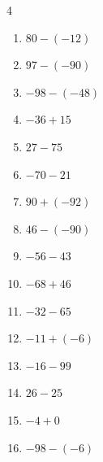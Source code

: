 \begin{multicols}{4}
\begin{enumerate}
        \phantom{$=-149$}

  \item $80-(-12)$

        \phantom{$=92$}

  \item $97-(-90)$

        \phantom{$=187$}

  \item $-98-(-48)$

        \phantom{$=-50$}

  \item $-36+15$

        \phantom{$=-21$}

  \item $27-75$

        \phantom{$=-48$}

  \item $-70-21$

        \phantom{$=-91$}

  \item $90+(-92)$

        \phantom{$=-2$}

  \item $46-(-90)$

        \phantom{$=136$}

  \item $-56-43$

        \phantom{$=-99$}

\columnbreak %

  \item $-68+46$

        \phantom{$=-22$}

  \item $-32-65$

        \phantom{$=-97$}

  \item $-11+(-6)$

        \phantom{$=-17$}

  \item $-16-99$

        \phantom{$=-115$}

  \item $26-25$

        \phantom{$=1$}

  \item $-4+0$

        \phantom{$=-4$}

  \item $-98-(-6)$


\end{enumerate}
\end{multicols}
